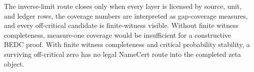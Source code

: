 \begin{principle}
\label{prin:rh-certified-inverse-limit-audit-boundary}
The inverse-limit route closes only when every layer is licensed by
source, unit, and ledger rows, the coverage numbers are interpreted as
gap-coverage measures, and every off-critical candidate is finite-witness
visible.  Without finite witness completeness, measure-one coverage
would be insufficient for a constructive BEDC proof.  With finite
witness completeness and critical probability stability, a surviving
off-critical zero has no legal NameCert route into the completed zeta
object.
\end{principle}
